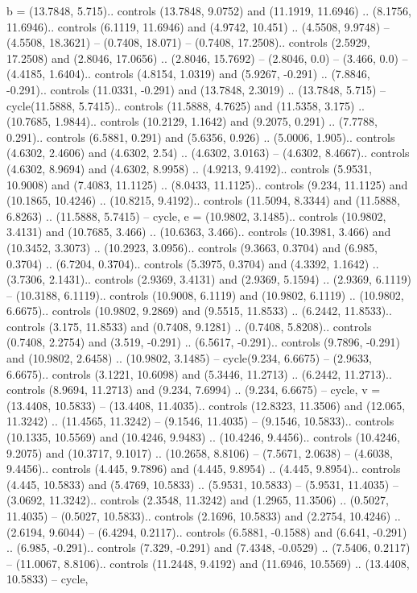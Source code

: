 {b} = {(13.7848, 5.715).. controls (13.7848, 9.0752) and (11.1919, 11.6946) .. (8.1756, 11.6946).. controls (6.1119, 11.6946) and (4.9742, 10.451) .. (4.5508, 9.9748) -- (4.5508, 18.3621) -- (0.7408, 18.071) -- (0.7408, 17.2508).. controls (2.5929, 17.2508) and (2.8046, 17.0656) .. (2.8046, 15.7692) -- (2.8046, 0.0) -- (3.466, 0.0) -- (4.4185, 1.6404).. controls (4.8154, 1.0319) and (5.9267, -0.291) .. (7.8846, -0.291).. controls (11.0331, -0.291) and (13.7848, 2.3019) .. (13.7848, 5.715) -- cycle(11.5888, 5.7415).. controls (11.5888, 4.7625) and (11.5358, 3.175) .. (10.7685, 1.9844).. controls (10.2129, 1.1642) and (9.2075, 0.291) .. (7.7788, 0.291).. controls (6.5881, 0.291) and (5.6356, 0.926) .. (5.0006, 1.905).. controls (4.6302, 2.4606) and (4.6302, 2.54) .. (4.6302, 3.0163) -- (4.6302, 8.4667).. controls (4.6302, 8.9694) and (4.6302, 8.9958) .. (4.9213, 9.4192).. controls (5.9531, 10.9008) and (7.4083, 11.1125) .. (8.0433, 11.1125).. controls (9.234, 11.1125) and (10.1865, 10.4246) .. (10.8215, 9.4192).. controls (11.5094, 8.3344) and (11.5888, 6.8263) .. (11.5888, 5.7415) -- cycle},
{e} = {(10.9802, 3.1485).. controls (10.9802, 3.4131) and (10.7685, 3.466) .. (10.6363, 3.466).. controls (10.3981, 3.466) and (10.3452, 3.3073) .. (10.2923, 3.0956).. controls (9.3663, 0.3704) and (6.985, 0.3704) .. (6.7204, 0.3704).. controls (5.3975, 0.3704) and (4.3392, 1.1642) .. (3.7306, 2.1431).. controls (2.9369, 3.4131) and (2.9369, 5.1594) .. (2.9369, 6.1119) -- (10.3188, 6.1119).. controls (10.9008, 6.1119) and (10.9802, 6.1119) .. (10.9802, 6.6675).. controls (10.9802, 9.2869) and (9.5515, 11.8533) .. (6.2442, 11.8533).. controls (3.175, 11.8533) and (0.7408, 9.1281) .. (0.7408, 5.8208).. controls (0.7408, 2.2754) and (3.519, -0.291) .. (6.5617, -0.291).. controls (9.7896, -0.291) and (10.9802, 2.6458) .. (10.9802, 3.1485) -- cycle(9.234, 6.6675) -- (2.9633, 6.6675).. controls (3.1221, 10.6098) and (5.3446, 11.2713) .. (6.2442, 11.2713).. controls (8.9694, 11.2713) and (9.234, 7.6994) .. (9.234, 6.6675) -- cycle},
{v} = {(13.4408, 10.5833) -- (13.4408, 11.4035).. controls (12.8323, 11.3506) and (12.065, 11.3242) .. (11.4565, 11.3242) -- (9.1546, 11.4035) -- (9.1546, 10.5833).. controls (10.1335, 10.5569) and (10.4246, 9.9483) .. (10.4246, 9.4456).. controls (10.4246, 9.2075) and (10.3717, 9.1017) .. (10.2658, 8.8106) -- (7.5671, 2.0638) -- (4.6038, 9.4456).. controls (4.445, 9.7896) and (4.445, 9.8954) .. (4.445, 9.8954).. controls (4.445, 10.5833) and (5.4769, 10.5833) .. (5.9531, 10.5833) -- (5.9531, 11.4035) -- (3.0692, 11.3242).. controls (2.3548, 11.3242) and (1.2965, 11.3506) .. (0.5027, 11.4035) -- (0.5027, 10.5833).. controls (2.1696, 10.5833) and (2.2754, 10.4246) .. (2.6194, 9.6044) -- (6.4294, 0.2117).. controls (6.5881, -0.1588) and (6.641, -0.291) .. (6.985, -0.291).. controls (7.329, -0.291) and (7.4348, -0.0529) .. (7.5406, 0.2117) -- (11.0067, 8.8106).. controls (11.2448, 9.4192) and (11.6946, 10.5569) .. (13.4408, 10.5833) -- cycle},
